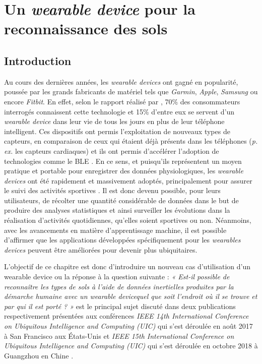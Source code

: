 \chapter{Un \textit{wearable device} pour la reconnaissance des sols}
\label{chap:4}

\section{Introduction}

Au cours des dernières années, les \textit{wearable devices} ont gagné en popularité, poussée par les grands fabricants de matériel tels que \textit{Garmin}, \textit{Apple}, \textit{Samsung} ou encore \textit{Fitbit}. En effet, selon le rapport réalisé par \cite{Nielsen2014}, 70\% des consommateurs interrogés connaissent cette technologie et 15\% d'entre eux se servent d'un \textit{wearable device} dans leur vie de tous les jours en plus de leur téléphone intelligent. Ces dispositifs ont permis l'exploitation de nouveaux types de capteurs, en comparaison de ceux qui étaient déjà présents dans les téléphones (\textit{p. ex.} les capteurs cardiaques) et ils ont permis d'accélérer l'adoption de technologies comme le \acs{BLE} \citep{Taplett}. En ce sens, et puisqu'ils représentent un moyen pratique et portable pour enregistrer des données physiologiques,  les \textit{wearable devices} ont été rapidement et massivement adoptés, principalement pour assurer le suivi des activités sportives \citep{NPDGroup2015}. Il est donc devenu possible, pour leurs utilisateurs, de récolter une quantité considérable de données dans le but de produire des analyses statistiques et ainsi surveiller les évolutions dans la réalisation d'activités quotidiennes, qu'elles soient sportives ou non. Néanmoins, avec les avancements en matière d'apprentissage machine, il est possible d'affirmer que les applications développées spécifiquement pour les \textit{wearables devices} peuvent être améliorées pour devenir plus ubiquitaires.

L'objectif de ce chapitre est donc d'introduire un nouveau cas d'utilisation d'un wearable device ou la réponse à la question suivante : \textit{« Est-il possible de reconnaître les types de sols à l'aide de données inertielles produites par la démarche humaine avec un wearable device\textemdash quel que soit l'endroit où il se trouve et par qui il est porté ? »} est le principal sujet discuté dans deux publications respectivement présentées aux conférences \textit{IEEE 14th International Conference on Ubiquitous Intelligence and Computing (UIC)} qui s'est déroulée en août 2017 à San Francisco aux États-Unis \citep{Thullier2017a} et \textit{IEEE 15th International Conference on Ubiquitous Intelligence and Computing (UIC)} qui s'est déroulée en octobre 2018 à Guangzhou en Chine \citep{Thullier2018}.


